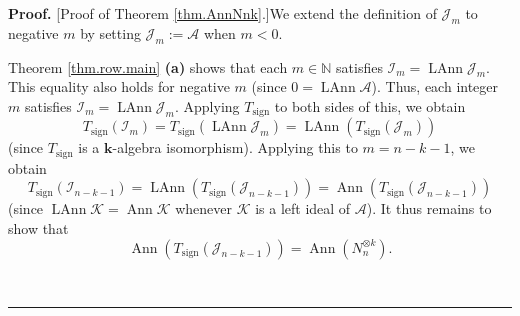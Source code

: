 \documentclass[numbers=enddot,12pt,final,onecolumn,notitlepage]{scrartcl}%
\numberwithin{exer}{subsection}
\theoremstyle{definition}
\newenvironment{proof}[1][Proof]{\noindent\textbf{#1.} }{\ \rule{0.5em}{0.5em}}
\begin{document}
\begin{proof}
[Proof of Theorem \ref{thm.AnnNnk}.]We extend the definition of $\mathcal{J}%
_{m}$ to negative $m$ by setting $\mathcal{J}_{m}:=\mathcal{A}$ when $m<0$.

Theorem \ref{thm.row.main} \textbf{(a)} shows that each $m\in\mathbb{N}$
satisfies $\mathcal{I}_{m}=\operatorname*{LAnn}\mathcal{J}_{m}$. This equality
also holds for negative $m$ (since $0=\operatorname*{LAnn}\mathcal{A}$). Thus,
each integer $m$ satisfies $\mathcal{I}_{m}=\operatorname*{LAnn}%
\mathcal{J}_{m}$. Applying $T_{\operatorname*{sign}}$ to both sides of this,
we obtain%
\[
T_{\operatorname*{sign}}\left(  \mathcal{I}_{m}\right)
=T_{\operatorname*{sign}}\left(  \operatorname*{LAnn}\mathcal{J}_{m}\right)
=\operatorname*{LAnn}\left(  T_{\operatorname*{sign}}\left(  \mathcal{J}%
_{m}\right)  \right)
\]
(since $T_{\operatorname*{sign}}$ is a $\mathbf{k}$-algebra isomorphism).
Applying this to $m=n-k-1$, we obtain%
\[
T_{\operatorname*{sign}}\left(  \mathcal{I}_{n-k-1}\right)
=\operatorname*{LAnn}\left(  T_{\operatorname*{sign}}\left(  \mathcal{J}%
_{n-k-1}\right)  \right)  =\operatorname*{Ann}\left(  T_{\operatorname*{sign}%
}\left(  \mathcal{J}_{n-k-1}\right)  \right)
\]
(since $\operatorname*{LAnn}\mathcal{K}=\operatorname*{Ann}\mathcal{K}$
whenever $\mathcal{K}$ is a left ideal of $\mathcal{A}$). It thus remains to
show that%
\begin{equation}
\operatorname*{Ann}\left(  T_{\operatorname*{sign}}\left(  \mathcal{J}%
_{n-k-1}\right)  \right)  =\operatorname*{Ann}\left(  N_{n}^{\otimes
k}\right)  . \label{pf.thm.AnnNnk.goal2}%
\end{equation}



\end{proof}
\end{document}
